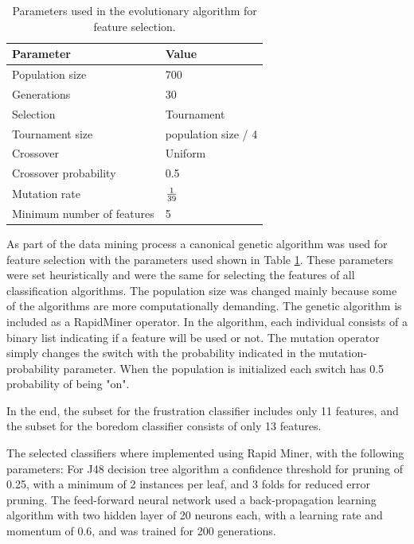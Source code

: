\documentclass[a4paper,twoside]{article}
\begin{document}
\begin{table}[h!tb]
\centering
\caption{Parameters used in the evolutionary algorithm for feature
  selection.}
\label{tab_ga}
    \begin{tabular}{ | l | l | }
      \hline
      Parameter & Value \\
      \hline
      Population size & 700 \\
      Generations & 30 \\
      Selection & Tournament \\
      Tournament size & population size / 4 \\
      Crossover & Uniform \\
      Crossover probability & 0.5 \\
      Mutation rate & $1 \over 39$ \\
      Minimum number of features & 5 \\
            \hline

    \end{tabular}
  \end{table}
  
As part of the data mining process a canonical genetic algorithm was used for feature
selection with the parameters used shown in Table \ref{tab_ga}. These
parameters were set heuristically and were the same for selecting the
features of all classification algorithms. The population size was changed
mainly because some of the algorithms are more computationally demanding. The
genetic algorithm is included as a RapidMiner operator. In the algorithm, each
individual consists of a binary list indicating if a feature will be used or
not. The mutation operator simply changes the switch with the probability
indicated in the mutation-probability parameter.  When the population is
initialized each switch has 0.5 probability of being "on".
 

In the end, the subset for the frustration classifier includes only 11 features, and 
the subset for the boredom classifier consists of only 13 features. 


The selected classifiers where implemented using Rapid Miner, with the
following parameters: For J48 decision tree algorithm a confidence threshold
for pruning of 0.25, with a minimum of 2 instances per leaf, and 3 folds for
reduced error pruning. The feed-forward neural network used a back-propagation
learning algorithm with two hidden layer of 20 neurons each, with a learning
rate and momentum of 0.6, and was trained for 200 generations.
\end{document}
